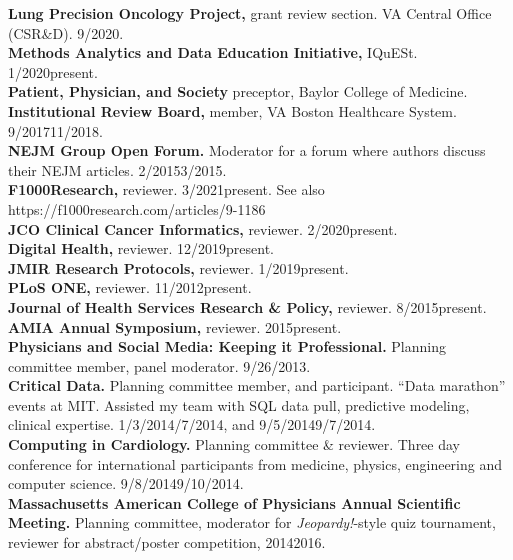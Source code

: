 \documentclass[10pt]{article}
\begin{document}
\textbf{Lung Precision Oncology Project,} grant review section. VA
Central Office  (CSR\&D). 9/2020.\\
\textbf{Methods Analytics and Data Education Initiative,} IQuESt.
1/2020\ndash{}present.\\
\textbf{Patient, Physician, and Society} preceptor, Baylor College of
Medicine.\\
\textbf{Institutional Review Board,} member, VA Boston Healthcare System.
9/2017\ndash{}11/2018.\\
\textbf{NEJM Group Open Forum.} Moderator for a forum where
authors discuss their NEJM articles. 2/2015\ndash{}3/2015.\\
\textbf{F1000Research,} reviewer. 3/2021\ndash{}present. See also
https://f1000research.com/articles/9-1186\\
\textbf{JCO Clinical Cancer Informatics,} reviewer. 2/2020\ndash{}present.\\
\textbf{Digital Health,} reviewer. 12/2019\ndash{}present.\\
\textbf{JMIR Research Protocols,} reviewer. 1/2019\ndash{}present.\\
\textbf{PLoS ONE,} reviewer. 11/2012\ndash{}present.\\
\textbf{Journal of Health Services Research \& Policy,} reviewer.
8/2015\ndash{}present.\\
\textbf{AMIA Annual Symposium,} reviewer. 2015\ndash{}present.\\
\textbf{Physicians and Social Media: Keeping it Professional.}
Planning committee member, panel moderator. 9/26/2013.\\
\textbf{Critical Data.} Planning committee member, and participant.
``Data marathon'' events at MIT. Assisted my team with SQL data pull,
predictive modeling, clinical expertise.
1/3/2014\ndash{}/7/2014, and 9/5/2014\ndash{}9/7/2014.\\
\textbf{Computing in Cardiology.} Planning committee \& reviewer.
Three day conference for international participants from medicine,
physics, engineering and computer science.
9/8/2014\ndash{}9/10/2014.\\
\textbf{Massachusetts American College of Physicians Annual Scientific
  Meeting.} Planning committee, moderator for \emph{Jeopardy!}-style
quiz tournament, reviewer for abstract/poster competition,
2014\ndash{}2016.
\end{document}
